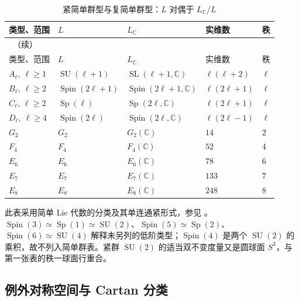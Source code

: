 \begingroup
\small
\setlength{\tabcolsep}{3pt}
\begin{longtable}{@{}p{}p{}p{}p{}p{}@{}}
	\caption{紧简单群型与复简单群型：\(L\) 对偶于 \(L_{\mathbb C}/L\)}\label{g3:tab:group-type-symmetric-spaces}\\
	\toprule
	类型、范围 & \(L\) & \(L_{\mathbb C}\) & 实维数 & 秩\\
	\midrule
	\endfirsthead
	\multicolumn{5}{l}{\thetable\ （续）}\\
	\toprule
	类型、范围 & \(L\) & \(L_{\mathbb C}\) & 实维数 & 秩\\
	\midrule
	\endhead
	\bottomrule
	\endfoot
	\(A_\ell,\ \ell\ge1\) & \(\operatorname{SU}(\ell+1)\) & \(\operatorname{SL}(\ell+1,\mathbb C)\) & \(\ell(\ell+2)\) & \(\ell\)\\[3pt]
	\(B_\ell,\ \ell\ge2\) & \(\operatorname{Spin}(2\ell+1)\) & \(\operatorname{Spin}(2\ell+1,\mathbb C)\) & \(\ell(2\ell+1)\) & \(\ell\)\\[3pt]
	\(C_\ell,\ \ell\ge2\) & \(\operatorname{Sp}(\ell)\) & \(\operatorname{Sp}(2\ell,\mathbb C)\) & \(\ell(2\ell+1)\) & \(\ell\)\\[3pt]
	\(D_\ell,\ \ell\ge4\) & \(\operatorname{Spin}(2\ell)\) & \(\operatorname{Spin}(2\ell,\mathbb C)\) & \(\ell(2\ell-1)\) & \(\ell\)\\[3pt]
	\(G_2\) & \(G_2\) & \(G_2(\mathbb C)\) & \(14\) & \(2\)\\
	\(F_4\) & \(F_4\) & \(F_4(\mathbb C)\) & \(52\) & \(4\)\\
	\(E_6\) & \(E_6\) & \(E_6(\mathbb C)\) & \(78\) & \(6\)\\
	\(E_7\) & \(E_7\) & \(E_7(\mathbb C)\) & \(133\) & \(7\)\\
	\(E_8\) & \(E_8\) & \(E_8(\mathbb C)\) & \(248\) & \(8\)\\
\end{longtable}
\endgroup

此表采用简单 Lie 代数的分类及其单连通紧形式，参见 \cite[第V章第4节、第VII章第1节]{Loos1969SymmetricII}。\(\operatorname{Spin}(3)\simeq\operatorname{Sp}(1)\simeq\operatorname{SU}(2)\)、\(\operatorname{Spin}(5)\simeq\operatorname{Sp}(2)\)、\(\operatorname{Spin}(6)\simeq\operatorname{SU}(4)\) 解释未另列的低阶类型；\(\operatorname{Spin}(4)\) 是两个 \(\operatorname{SU}(2)\) 的乘积，故不列入简单群表。紧群 \(\operatorname{SU}(2)\) 的适当双不变度量又是圆球面 \(S^3\)，与第一张表的秩一球面行重合。

\subsection{例外对称空间与 Cartan 分类}
\label{g3:subsec:0506:04}

